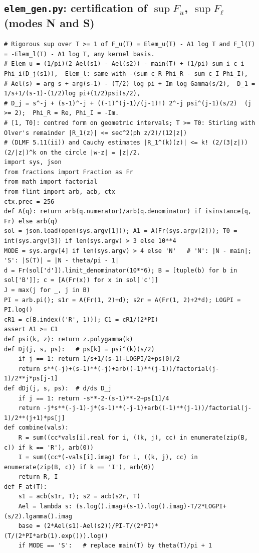 \documentclass[11pt,reqno]{amsart}
\numberwithin{equation}{section}
\theoremstyle{definition}
\theoremstyle{remark}
\begin{document}
\subsection*{\texttt{elem\_gen.py}: certification of $\sup F_u$, $\sup F_\ell$ (modes N and S)}
\label{app:cert_elem}
\begin{lstlisting}
# Rigorous sup over T >= 1 of F_u(T) = Elem_u(T) - A1 log T and F_l(T) = -Elem_l(T) - A1 log T, any kernel basis.
# Elem_u = (1/pi)(2 Ael(s1) - Ael(s2)) - main(T) + (1/pi) sum_i c_i Phi_i(D_j(s1)),  Elem_l: same with -(sum c_R Phi_R - sum c_I Phi_I),
# Ael(s) = arg s + arg(s-1) - (T/2) log pi + Im log Gamma(s/2),  D_1 = 1/s+1/(s-1)-(1/2)log pi+(1/2)psi(s/2),
# D_j = s^-j + (s-1)^-j + ((-1)^(j-1)/(j-1)!) 2^-j psi^(j-1)(s/2)  (j >= 2);  Phi_R = Re, Phi_I = -Im.
# [1, T0]: centred form on geometric intervals; T >= T0: Stirling with Olver's remainder |R_1(z)| <= sec^2(ph z/2)/(12|z|)
# (DLMF 5.11(ii)) and Cauchy estimates |R_1^(k)(z)| <= k! (2/(3|z|)) (2/|z|)^k on the circle |w-z| = |z|/2.
import sys, json
from fractions import Fraction as Fr
from math import factorial
from flint import arb, acb, ctx
ctx.prec = 256
def A(q): return arb(q.numerator)/arb(q.denominator) if isinstance(q, Fr) else arb(q)
sol = json.load(open(sys.argv[1])); A1 = A(Fr(sys.argv[2])); T0 = int(sys.argv[3]) if len(sys.argv) > 3 else 10**4
MODE = sys.argv[4] if len(sys.argv) > 4 else 'N'   # 'N': |N - main|;  'S': |S(T)| = |N - theta/pi - 1|
d = Fr(sol['d']).limit_denominator(10**6); B = [tuple(b) for b in sol['B']]; c = [A(Fr(x)) for x in sol['c']]
J = max(j for _, j in B)
PI = arb.pi(); s1r = A(Fr(1, 2)+d); s2r = A(Fr(1, 2)+2*d); LOGPI = PI.log()
cR1 = c[B.index(('R', 1))]; C1 = cR1/(2*PI)
assert A1 >= C1
def psi(k, z): return z.polygamma(k)
def Dj(j, s, ps):   # ps[k] = psi^(k)(s/2)
    if j == 1: return 1/s+1/(s-1)-LOGPI/2+ps[0]/2
    return s**(-j)+(s-1)**(-j)+arb((-1)**(j-1))/factorial(j-1)/2**j*ps[j-1]
def dDj(j, s, ps):  # d/ds D_j
    if j == 1: return -s**-2-(s-1)**-2+ps[1]/4
    return -j*s**(-j-1)-j*(s-1)**(-j-1)+arb((-1)**(j-1))/factorial(j-1)/2**(j+1)*ps[j]
def combine(vals):
    R = sum((cc*vals[i].real for i, ((k, j), cc) in enumerate(zip(B, c)) if k == 'R'), arb(0))
    I = sum((cc*(-vals[i].imag) for i, ((k, j), cc) in enumerate(zip(B, c)) if k == 'I'), arb(0))
    return R, I
def F_at(T):
    s1 = acb(s1r, T); s2 = acb(s2r, T)
    Ael = lambda s: (s.log().imag+(s-1).log().imag)-T/2*LOGPI+(s/2).lgamma().imag
    base = (2*Ael(s1)-Ael(s2))/PI-T/(2*PI)*(T/(2*PI*arb(1).exp())).log()
    if MODE == 'S':   # replace main(T) by theta(T)/pi + 1

\end{lstlisting}
\end{document}
